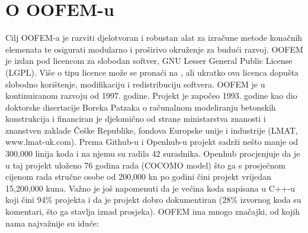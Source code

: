 \documentclass[a4paper,twoside,12pt]{memoir} %
\begin{document}
\section{O OOFEM-u}
Cilj OOFEM-a je razviti djelotvoran i robustan alat za izračune metode konačnih elemenata te osigurati modularno i proširivo okruženje za budući razvoj. OOFEM je izdan pod licencom za slobodan softver, GNU Lesser General Public License (LGPL). Više o tipu licence može se pronaći na \cite{gnu_licence}, ali ukratko ova licenca dopušta slobodno korištenje, modifikaciju i redistribuciju softvera. OOFEM je u kontinuiranom razvoju od 1997. godine. Projekt je započeo 1993. godine kao dio doktorske disertacije Boreka Patzaka o računalnom modeliranju betonskih konstrukcija i financiran je djelomično od strane ministarstva znanosti i znanstven zaklade Češke Republike, fondova Europske unije i industrije (LMAT, www.lmat-uk.com). Prema Github-u \cite{oofem_github}  i Openhub-u \cite{oofem_openhub} projekt sadrži nešto manje od 300,000 linija koda i na njemu su radila 42 suradnika. Openhub procjenjuje da je u taj projekt uloženo 76 godina rada (COCOMO model) što ga s prosječnom cijenom rada stručne osobe od 200,000 kn po godini čini projekt vrijedan 15,200,000 kuna. Važno je još napomenuti da je većina koda napisana u C++-u koji čini 94\% projekta i da je projekt dobro dokumentiran (28\% izvornog koda su komentari, što ga stavlja iznad prosjeka). OOFEM ima mnogo značajki, od kojih nama najvažnije su iduće:
\end{document}
